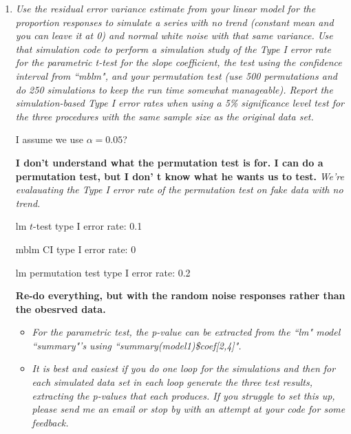 \documentclass[11pt]{article}\usepackage[]{graphicx}\usepackage[]{color}
\begin{document}
\begin{enumerate}
However, I would question the validity of the confidence level set using {\texttt confint()} on an {\texttt mblm()} object. If there was strong evidence of an effect of temperature, at the 95\% confidence level, we would expect to ``reject" 5\% of the time, meaning that approximately 5\% of confidence intervals, in the long run, should contain 0.


\item%
{\it Use the residual error variance estimate from your linear model for the proportion responses to simulate a series with no trend (constant mean and you can leave it at 0) and normal white noise with that same variance. Use that simulation code to perform a simulation study of the Type I error rate for the parametric t-test for the slope coefficient, the test using the confidence interval from ``mblm", and your permutation test (use 500 permutations and do 250 simulations to keep the run time somewhat manageable). Report the simulation-based Type I error rates when using a 5\% significance level test for the three procedures with the same sample size as the original data set.}

I assume we use $\alpha=0.05$?

{\bf I don't understand what the permutation test is for. I can do a permutation test, but I don' t know what he wants us to test.} \emph{We're evalauating the Type I error rate of the permutation test on fake data with no trend.}



lm $t$-test type I error rate: 0.1

mblm CI type I error rate: 0

lm permutation test type I error rate: 0.2

{\bf Re-do everything, but with the random noise responses rather than the obesrved data.}

\begin{itemize}
\item%
{\it For the parametric test, the p-value can be extracted from the ``lm"  model ``summary"'s using ``summary(model1)\$coef[2,4]".}



\item%
{\it It is best and easiest if you do one loop for the simulations and then for each simulated data set in each loop generate the three test results, extracting the p-values that each produces. If you struggle to set this up, please send me an email or stop by with an attempt at your code for some feedback.}


\end{itemize}
\end{enumerate}
\end{document}
